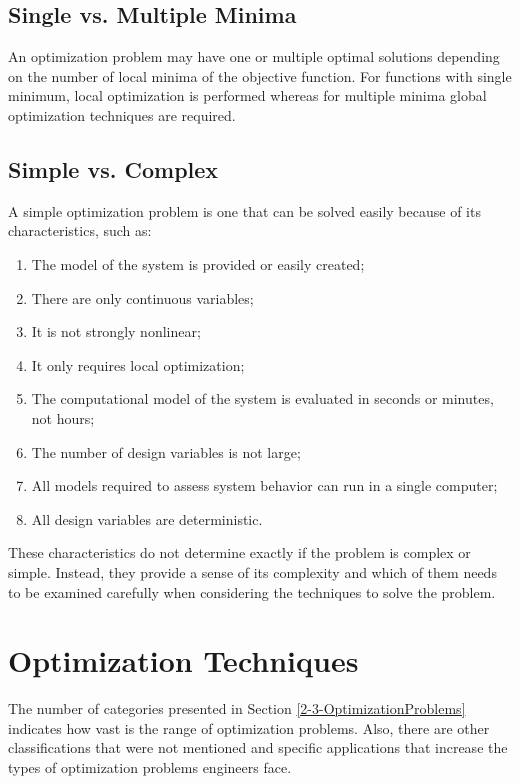 \subsection{Single vs. Multiple Minima}

An optimization problem may have one or multiple optimal solutions depending on the number of local minima of the objective function. For functions with single minimum, local optimization is performed whereas for multiple minima global optimization techniques are required.

\subsection{Simple vs. Complex}

A simple optimization problem is one that can be solved easily because of its characteristics, such as:

\begin{enumerate}
	\item The model of the system is provided or easily created;
	\item There are only continuous variables;
	\item It is not strongly nonlinear;
	\item It only requires local optimization;
	\item The computational model of the system is evaluated in seconds or minutes, not hours;
	\item The number of design variables is not large;
	\item All models required to assess system behavior can run in a single computer;
	\item All design variables are deterministic.
\end{enumerate}

These characteristics do not determine exactly if the problem is complex or simple. Instead, they provide a sense of its complexity and which of them needs to be examined carefully when considering the techniques to solve the problem.

\section{Optimization Techniques} \label{2-4-OptimizationAlgorithms}

The number of categories presented in Section \ref{2-3-OptimizationProblems} indicates how vast is the range of optimization problems. Also, there are other classifications that were not mentioned and specific applications that increase the types of optimization problems engineers face. 

